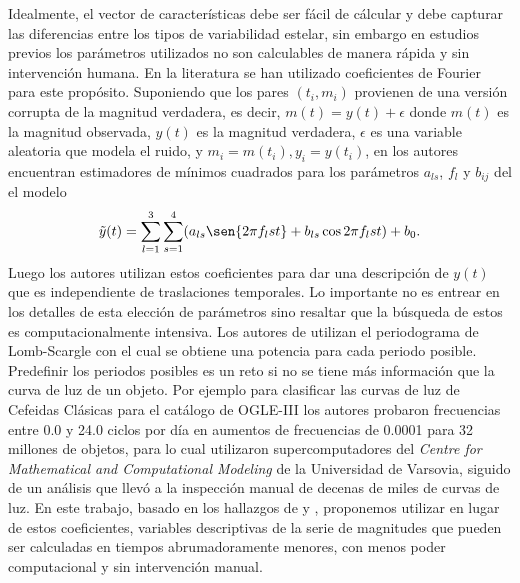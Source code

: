 \documentclass[letterpaper,12pt]{book}
\begin{document}
Idealmente, el vector de características debe ser fácil de cálcular y debe capturar las diferencias entre los tipos de variabilidad estelar, sin embargo en estudios previos \cite{debosscher_automated_2007, sarro_automated_2009, richards_machine-learned_2011} los parámetros utilizados no son calculables de manera rápida y sin intervención humana. En la literatura \cite{debosscher_automated_2007, sarro_automated_2009, richards_machine-learned_2011} se han utilizado coeficientes de Fourier para este propósito. Suponiendo que los pares $(t_i,m_i)$ provienen de una versión corrupta  de la magnitud verdadera, es decir, $m(t) = y(t) + \epsilon$ donde $m(t)$ es la magnitud observada, $y(t)$ es la magnitud verdadera, $\epsilon$ es una variable aleatoria que modela el ruido, y $m_i = m(t_i), y_i = y(t_i)$, en \cite{debosscher_automated_2007} los autores encuentran estimadores de mínimos cuadrados para los parámetros $a_{ls}$, $f_l$ y $b_{ij}$ del el modelo  
\begin{equation*}
\tilde{y}(t)=\sum_{l=1}^{3}\sum_{s=1}^{4}(a_{ls}\sen{2\pi f_l st} + b_{ls}\cos{2\pi f_l st}) + b_0.
\end{equation*}  
Luego los autores utilizan estos coeficientes para dar una descripción de $y(t)$ que es independiente de traslaciones temporales. Lo importante no es entrear en los detalles de esta elección de parámetros sino resaltar que la búsqueda de estos es computacionalmente intensiva. Los autores de \cite{debosscher_automated_2007} utilizan el periodograma de Lomb-Scargle \cite{scargle_studies_1982} con el cual se obtiene una potencia para cada periodo posible. Predefinir los periodos posibles es un reto si no se tiene más información que la curva de luz de un objeto. Por ejemplo para clasificar las curvas de luz de Cefeidas Clásicas para el catálogo de OGLE-III \cite{soszynski_optical_2008-1} los autores probaron frecuencias entre 0.0 y 24.0 ciclos por día en aumentos de frecuencias de 0.0001 para 32 millones de objetos, para lo cual utilizaron supercomputadores del  \textit{Centre for Mathematical and Computational Modeling} de la Universidad de Varsovia, siguido de un análisis que llevó a la inspección manual de decenas de miles de curvas de luz. En este trabajo, basado en los hallazgos de \cite{rodriguez_feliciano_alisis_2012} y \cite{sabogal_search_2014}, proponemos utilizar en lugar de estos coeficientes, variables descriptivas de la serie de magnitudes  que pueden ser calculadas en tiempos abrumadoramente menores, con menos poder computacional y sin intervención manual.
\end{document}
